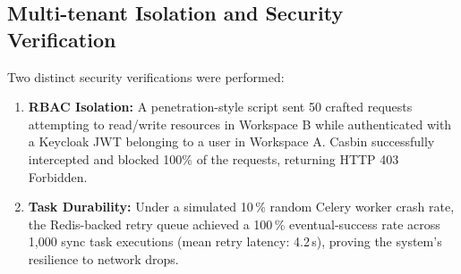 \subsection{Multi-tenant Isolation and Security Verification}
Two distinct security verifications were performed:
\begin{enumerate}
    \item \textbf{RBAC Isolation:} A penetration-style script sent 50 crafted requests attempting to read/write resources in Workspace B while authenticated with a Keycloak JWT belonging to a user in Workspace A. Casbin successfully intercepted and blocked 100\% of the requests, returning HTTP 403 Forbidden.
    \item \textbf{Task Durability:} Under a simulated 10\,\% random Celery worker crash rate, the Redis-backed retry queue achieved a 100\,\% eventual-success rate across 1{,}000 sync task executions (mean retry latency: 4.2\,s), proving the system's resilience to network drops.
\end{enumerate}
